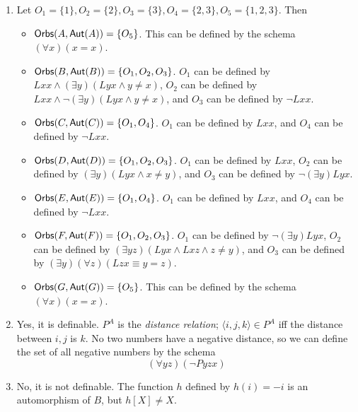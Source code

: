 \begin{mdframed}[linewidth=1]
\begin{enumerate}
    \item Let $O_1 = \{1\}, O_2 = \{2\}, O_3 = \{3\}, O_4 = \{2, 3\}, O_5 = \{1, 2, 3\}$. Then 
    \begin{itemize}
        \item $\mbox{$\mathsf{Orbs}(A,\mbox{$\mathsf{Aut}(A)$})$} = \{O_5\}$. This can be defined by the schema $(\forall x)(x = x)$. 

        \item $\mbox{$\mathsf{Orbs}(B,\mbox{$\mathsf{Aut}(B)$})$} = \{O_1, O_2, O_3\}$. $O_1$ can be defined by $Lxx \land (\exists y)(Lyx \land y \neq x)$, $O_2$ can be defined by $Lxx \land \lnot (\exists y)(Lyx \land y \neq x)$, and $O_3$ can be defined by $\lnot Lxx$. 

        \item $\mbox{$\mathsf{Orbs}(C,\mbox{$\mathsf{Aut}(C)$})$} = \{O_1, O_4\}$. $O_1$ can be defined by $Lxx$, and $O_4$ can be defined by $\lnot Lxx$. 

        \item $\mbox{$\mathsf{Orbs}(D,\mbox{$\mathsf{Aut}(D)$})$} = \{O_1, O_2, O_3\}$. $O_1$ can be defined by $Lxx$, $O_2$ can be defined by $(\exists y)(Lyx \land x \neq y)$, and $O_3$ can be defined by $\lnot (\exists y)Lyx$. 

        \item $\mbox{$\mathsf{Orbs}(E,\mbox{$\mathsf{Aut}(E)$})$} = \{O_1, O_4\}$. $O_1$ can be defined by $Lxx$, and $O_4$ can be defined by $\lnot Lxx$. 

        \item $\mbox{$\mathsf{Orbs}(F,\mbox{$\mathsf{Aut}(F)$})$} = \{O_1, O_2, O_3\}$. $O_1$ can be defined by $\lnot (\exists y)Lyx$, $O_2$ can be defined by $(\exists yz)(Lyx \land Lxz \land z \neq y)$, and $O_3$ can be defined by $(\exists y)(\forall z)(Lzx \equiv y = z)$. 

        \item $\mbox{$\mathsf{Orbs}(G,\mbox{$\mathsf{Aut}(G)$})$} = \{O_5\}$. This can be defined by the schema $(\forall x)(x = x)$. 
    \end{itemize}

    \item Yes, it is definable. $P^A$ is the \emph{distance relation}; $\langle i, j, k \rangle \in P^A$ iff the distance between $i, j$ is $k$. No two numbers have a negative distance, so we can define the set of all negative numbers by the schema
    \[
        (\forall yz)(\lnot Pyzx)
    \]

    \item No, it is not definable. The function $h$ defined by $h(i) = -i$ is an automorphism of $B$, but $h[X] \neq X$. 


\end{enumerate}
\end{mdframed}
